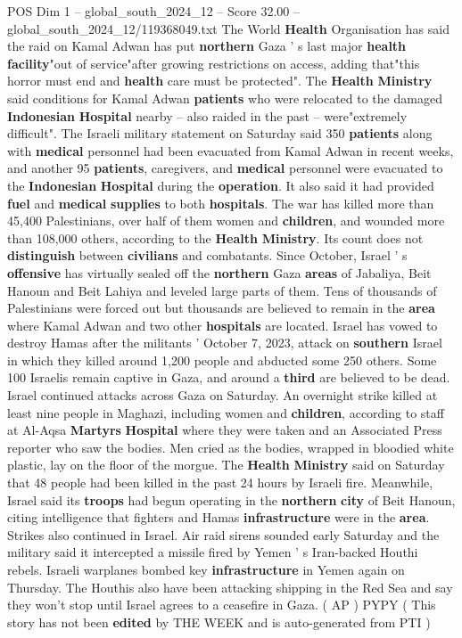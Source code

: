 \begin{textsample}{POS Dim 1 – global\_south\_2024\_12 – Score 32.00 – global\_south\_2024\_12/119368049.txt}
The World \textbf{Health} Organisation has said the raid on Kamal Adwan has put \textbf{northern} Gaza ' s last major \textbf{health} \textbf{facility}"out of service"after growing restrictions on access, adding that"this horror must end and \textbf{health} care must be protected".
The \textbf{Health} \textbf{Ministry} said conditions for Kamal Adwan \textbf{patients} who were relocated to the damaged \textbf{Indonesian} \textbf{Hospital} nearby -- also raided in the past -- were"extremely difficult".
The Israeli military statement on Saturday said 350 \textbf{patients} along with \textbf{medical} personnel had been evacuated from Kamal Adwan in recent weeks, and another 95 \textbf{patients}, caregivers, and \textbf{medical} personnel were evacuated to the \textbf{Indonesian} \textbf{Hospital} during the \textbf{operation}.
It also said it had provided \textbf{fuel} and \textbf{medical} \textbf{supplies} to both \textbf{hospitals}.
The war has killed more than 45,400 Palestinians, over half of them women and \textbf{children}, and wounded more than 108,000 others, according to the \textbf{Health} \textbf{Ministry}.
Its count does not \textbf{distinguish} between \textbf{civilians} and combatants.
Since October, Israel ' s \textbf{offensive} has virtually sealed off the \textbf{northern} Gaza \textbf{areas} of Jabaliya, Beit Hanoun and Beit Lahiya and leveled large parts of them.
Tens of thousands of Palestinians were forced out but thousands are believed to remain in the \textbf{area} where Kamal Adwan and two other \textbf{hospitals} are located.
Israel has vowed to destroy Hamas after the militants ' October 7, 2023, attack on \textbf{southern} Israel in which they killed around 1,200 people and abducted some 250 others.
Some 100 Israelis remain captive in Gaza, and around a \textbf{third} are believed to be dead.
Israel continued attacks across Gaza on Saturday.
An overnight strike killed at least nine people in Maghazi, including women and \textbf{children}, according to staff at Al-Aqsa \textbf{Martyrs} \textbf{Hospital} where they were taken and an Associated Press reporter who saw the bodies.
Men cried as the bodies, wrapped in bloodied white plastic, lay on the floor of the morgue.
The \textbf{Health} \textbf{Ministry} said on Saturday that 48 people had been killed in the past 24 hours by Israeli fire.
Meanwhile, Israel said its \textbf{troops} had begun operating in the \textbf{northern} \textbf{city} of Beit Hanoun, citing intelligence that fighters and Hamas \textbf{infrastructure} were in the \textbf{area}.
Strikes also continued in Israel.
Air raid sirens sounded early Saturday and the military said it intercepted a missile fired by Yemen ' s Iran-backed Houthi rebels.
Israeli warplanes bombed key \textbf{infrastructure} in Yemen again on Thursday.
The Houthis also have been attacking shipping in the Red Sea and say they won't stop until Israel agrees to a ceasefire in Gaza. ( AP ) PYPY ( This story has not been \textbf{edited} by THE WEEK and is auto-generated from PTI )


\end{textsample}
